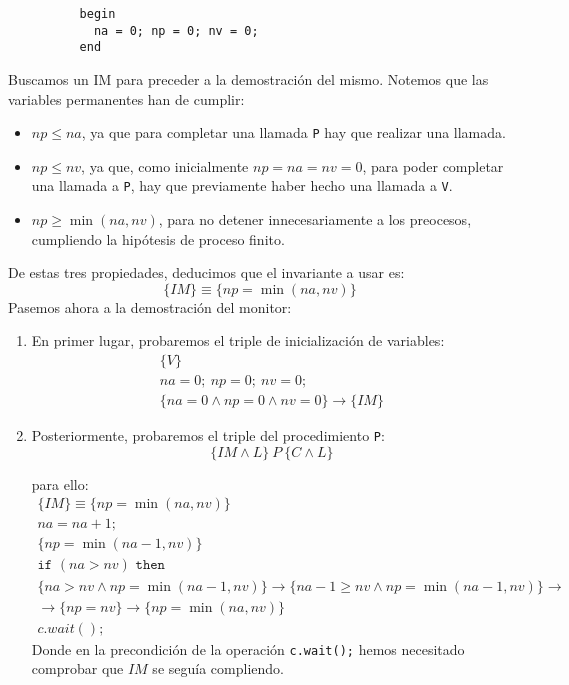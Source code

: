\begin{ejercicio*}
\begin{verbatim}
          begin
            na = 0; np = 0; nv = 0;
          end
    \end{verbatim}
    Buscamos un IM para preceder a la demostración del mismo. Notemos que las variables permanentes han de cumplir:
    \begin{itemize}
        \item $np \leq na$, ya que para completar una llamada \verb|P| hay que realizar una llamada.
        \item $np \leq nv$, ya que, como inicialmente $np = na = nv = 0$, para poder completar una llamada a \verb|P|, hay que previamente haber hecho una llamada a \verb|V|.
        \item $np \geq \min(na,nv)$, para no detener innecesariamente a los preocesos, cumpliendo la hipótesis de proceso finito.
    \end{itemize}
    De estas tres propiedades, deducimos que el invariante a usar es:
    \begin{equation*}
        \{IM\} \equiv \{np = \min(na,nv)\}
    \end{equation*}
    Pasemos ahora a la demostración del monitor:
    \begin{enumerate}
        \item En primer lugar, probaremos el triple de inicialización de variables:
            \begin{gather*}
                \{V\} \\
                na = 0;\ np=0;\ nv=0; \\
                \{na = 0 \land np = 0 \land nv = 0\} \rightarrow \{IM\}
            \end{gather*}
        \item Posteriormente, probaremos el triple del procedimiento \verb|P|:
            \begin{equation*}
                \{IM \land L\}\ P\ \{C \land L\}
            \end{equation*}

            para ello:
            \begin{gather*}
                \{IM\}\equiv \{np=\min(na,nv)\} \\
                na = na + 1;\\
                \{np = \min(na-1,nv)\} \\
                \texttt{if\ }(na > nv) \texttt{\ then\ } \\
                \{na > nv \land np = \min(na-1,nv)\} \rightarrow \{na-1\geq nv \land np = \min(na-1,nv)\} \rightarrow \\ 
                \rightarrow\{np = nv\} \rightarrow \{np = \min(na,nv)\} \\
                c.wait();
            \end{gather*}
            Donde en la precondición de la operación \verb|c.wait();| hemos necesitado comprobar que $IM$ se seguía compliendo.


\end{enumerate}
\end{ejercicio*}
